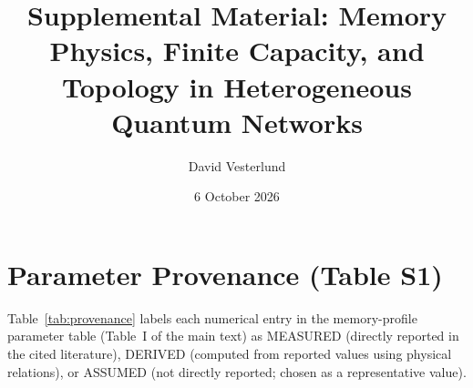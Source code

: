 \documentclass[aps,prapplied,reprint,superscriptaddress]{revtex4-2}
\begin{document}
\title{Supplemental Material: Memory Physics, Finite Capacity, and Topology in Heterogeneous Quantum Networks}

\author{David Vesterlund}

\date{6 October 2026}

\maketitle

\section{Parameter Provenance (Table S1)}

Table~\ref{tab:provenance} labels each numerical entry in the memory-profile parameter table (Table~I of the main text) as MEASURED (directly reported in the cited literature), DERIVED (computed from reported values using physical relations), or ASSUMED (not directly reported; chosen as a representative value).
\end{document}

